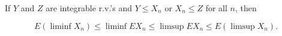 If $Y$ and $Z$ are integrable r.v.'s and $Y \leq X_n$ or $X_n \leq Z$ for all $n$, then

$$E(\liminf X_n) \leq \liminf E X_n \leq \limsup E X_n \leq E(\limsup X_n).$$
